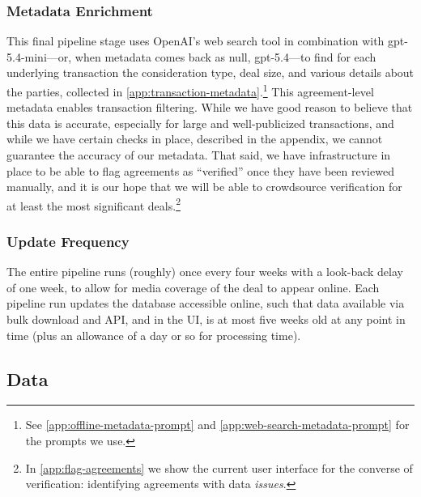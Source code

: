 \documentclass[12pt]{article}
\begin{document}
\subsubsection{Metadata Enrichment}\label{sec:metadata-enrichment}
This final pipeline stage uses OpenAI’s web search tool in combination with gpt-5.4-mini—or, when metadata comes back as null, gpt-5.4—to find for each underlying transaction the consideration type, deal size, and various details about the parties, collected in \autoref{app:transaction-metadata}.\footnote{See \autoref{app:offline-metadata-prompt} and \autoref{app:web-search-metadata-prompt} for the prompts we use.} This agreement-level metadata enables transaction filtering. While we have good reason to believe that this data is accurate, especially for large and well-publicized transactions, and while we have certain checks in place, described in the appendix, we cannot guarantee the accuracy of our metadata. That said, we have infrastructure in place to be able to flag agreements as ``verified'' once they have been reviewed manually, and it is our hope that we will be able to crowdsource verification for at least the most significant deals.\footnote{In \autoref{app:flag-agreements} we show the current user interface for the converse of verification: identifying agreements with data \emph{issues}.}

\subsubsection{Update Frequency}\label{sec:update-frequency}
The entire pipeline runs (roughly) once every four weeks with a look-back delay of one week, to allow for media coverage of the deal to appear online. Each pipeline run updates the database accessible online, such that data available via bulk download and API, and in the UI, is at most five weeks old at any point in time (plus an allowance of a day or so for processing time).

\subsection{Data}\label{sec:data}
\end{document}
